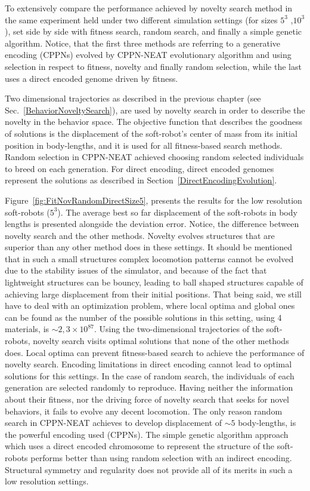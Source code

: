 To extensively compare the performance achieved by novelty search method in the same experiment held under two different simulation settings (for sizes $5^3$ ,$10^3$), set side by side with fitness search, random search, and finally a simple genetic algorithm. Notice, that the first three methods are referring to a generative encoding (CPPNs) evolved by CPPN-NEAT evolutionary algorithm and using selection in respect to fitness, novelty and finally random selection, while the last uses a direct encoded genome driven by fitness. 

Two dimensional trajectories as described in the previous chapter (see Sec.~\ref{BehaviorNoveltySearch}), are used by novelty search in order to describe the novelty in the behavior space. The objective function that describes the goodness of solutions is the displacement of the soft-robot's center of mass from its initial position in body-lengths, and it is used for all fitness-based search methods. Random selection in CPPN-NEAT achieved choosing random selected individuals to breed on each generation. For direct encoding, direct encoded genomes represent the solutions as described in Section~\ref{DirectEncodingEvolution}.

Figure~\ref{fig:FitNovRandomDirectSize5}, presents the results for the low resolution soft-robots ($5^3$). The average best so far displacement of the soft-robots in body lengths is presented alongside the deviation error. Notice, the difference between novelty search and the other methods. Novelty evolves structures that are superior than any other method does in these settings. It should be mentioned that in such a small structures complex locomotion patterns cannot be evolved due to the stability issues of the simulator, and because of the fact that lightweight structures can be bouncy, leading to ball shaped structures capable of achieving large displacement from their initial positions. That being said, we still have to deal with an optimization problem, where local optima and global ones can be found as the number of the possible solutions in this setting, using 4 materials, is $\sim 2,3 \times 10^{87}$. Using the two-dimensional trajectories of the soft-robots, novelty search visits optimal solutions that none of the other methods does. Local optima can prevent fitness-based search to achieve the performance of novelty search. Encoding limitations in direct encoding cannot lead to optimal solutions for this settings. In the case of random search, the individuals of each generation are selected randomly to reproduce. Having neither the information about their fitness, nor the driving force of novelty search that seeks for novel behaviors, it fails to evolve any decent locomotion. The only reason random search in CPPN-NEAT achieves to develop displacement of $\sim 5$ body-lengths, is the powerful encoding used (CPPNs). The simple genetic algorithm approach which uses a direct encoded chromosome to represent the structure of the soft-robots performs better than using random selection with an indirect encoding. Structural symmetry and regularity does not provide all of its merits in such a low resolution settings.

